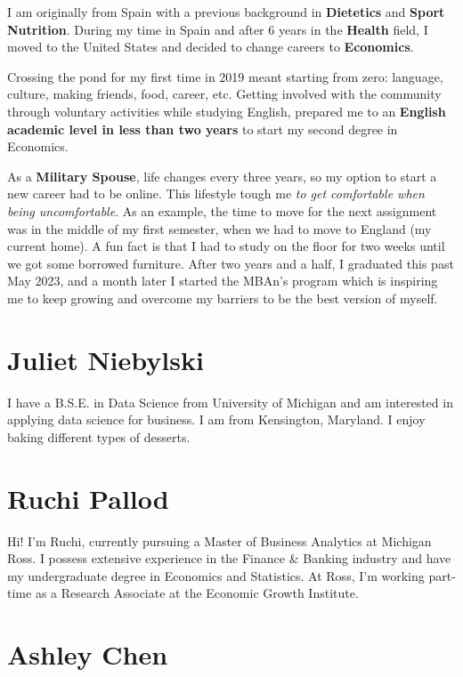 \documentclass[
]{book}
\begin{document}
I am originally from Spain with a previous background in \textbf{Dietetics} and \textbf{Sport Nutrition}. During my time in Spain and after 6 years in the \textbf{Health} field, I moved to the United States and decided to change careers to \textbf{Economics}.

Crossing the pond for my first time in 2019 meant starting from zero: language, culture, making friends, food, career, etc. Getting involved with the community through voluntary activities while studying English, prepared me to an \textbf{English academic level in less than two years} to start my second degree in Economics.

As a \textbf{Military Spouse}, life changes every three years, so my option to start a new career had to be online. This lifestyle tough me \emph{to get comfortable when being uncomfortable}. As an example, the time to move for the next assignment was in the middle of my first semester, when we had to move to England (my current home). A fun fact is that I had to study on the floor for two weeks until we got some borrowed furniture. After two years and a half, I graduated this past May 2023, and a month later I started the MBAn's program which is inspiring me to keep growing and overcome my barriers to be the best version of myself.

\hypertarget{juliet-niebylski}{%
\section{Juliet Niebylski}\label{juliet-niebylski}}

I have a B.S.E. in Data Science from University of Michigan and am interested in applying data science for business. I am from Kensington, Maryland. I enjoy baking different types of desserts.

\hypertarget{ruchi-pallod}{%
\section{Ruchi Pallod}\label{ruchi-pallod}}

Hi! I'm Ruchi, currently pursuing a Master of Business Analytics at Michigan Ross. I possess extensive experience in the Finance \& Banking industry and have my undergraduate degree in Economics and Statistics. At Ross, I'm working part-time as a Research Associate at the Economic Growth Institute.

\hypertarget{ashley-chen}{%
\section{Ashley Chen}\label{ashley-chen}}
\end{document}
